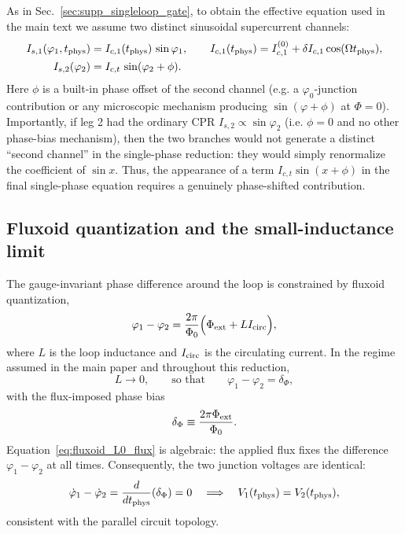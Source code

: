 \documentclass[prl,twocolumn,superscriptaddress,showpacs,nofootinbib]{revtex4-2}
\begin{document}
As in Sec.~\ref{sec:supp_singleloop_gate}, to obtain the effective equation
used in the main text we assume two distinct sinusoidal supercurrent channels:
\begin{align}
I_{s,1}(\varphi_1,t_{\rm phys})
&= I_{c,1}(t_{\rm phys})\,\sin\varphi_1,
\qquad
I_{c,1}(t_{\rm phys})
= I_{c,1}^{(0)} + \delta I_{c,1}\cos(\Omega t_{\rm phys}),
\label{eq:gate_mod_Ic_flux}
\\
I_{s,2}(\varphi_2)
&= I_{c,t}\,\sin(\varphi_2+\phi).
\label{eq:phi_shift_CPR_flux}
\end{align}
Here $\phi$ is a built-in phase offset of the second channel (e.g. a
$\varphi_0$-junction contribution or any microscopic mechanism producing $\sin(\varphi+\phi)$ at $\Phi=0$). Importantly, if leg 2 had the ordinary CPR $I_{s,2}\propto \sin\varphi_2$ (i.e. $\phi=0$ and no other phase-bias mechanism), then the two branches would not generate a distinct ``second channel'' in the single-phase reduction: they would simply renormalize the coefficient of $\sin x$. Thus, the appearance of a term $I_{c,t}\sin(x+\phi)$ in the final single-phase equation requires a genuinely phase-shifted contribution.

\subsection{Fluxoid quantization and the small-inductance limit}

The gauge-invariant phase difference around the loop is constrained by fluxoid
quantization,
\begin{equation}
\varphi_1-\varphi_2
= \frac{2\pi}{\Phi_0}\Big(\Phi_{\rm ext}+L I_{\rm circ}\Big),
\label{eq:fluxoid_general_flux}
\end{equation}
where $L$ is the loop inductance and $I_{\rm circ}$ is the circulating current.
In the regime assumed in the main paper and throughout this reduction,
\begin{equation}
L\to 0,
\qquad\text{so that}\qquad
\varphi_1-\varphi_2=\delta_\Phi,
\label{eq:fluxoid_L0_flux}
\end{equation}
with the flux-imposed phase bias
\begin{equation}
\delta_\Phi \equiv \frac{2\pi \Phi_{\rm ext}}{\Phi_0}.
\label{eq:deltaPhi_def}
\end{equation}
Equation~\eqref{eq:fluxoid_L0_flux} is algebraic: the applied flux fixes the difference $\varphi_1-\varphi_2$ at all times. Consequently, the two junction voltages are identical:
\begin{equation}
\dot\varphi_1-\dot\varphi_2=\frac{d}{dt_{\rm phys}}(\delta_\Phi)=0
\quad\Longrightarrow\quad
V_1(t_{\rm phys})=V_2(t_{\rm phys}),
\label{eq:common_voltage_flux}
\end{equation}
consistent with the parallel circuit topology.
\end{document}

